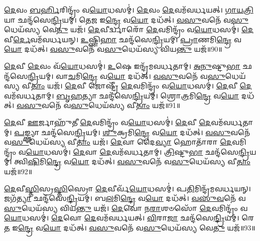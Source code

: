 \-\ul{𑌦𑍇}\-𑌵𑌂 \ul{𑌬}\-\-\ul{𑌰𑍍}\-𑌹𑌿𑌰𑌿𑌨𑍍𑌦𑍍𑌰𑌂᳴ 𑌵\-\ul{𑌯𑍋}\-𑌧𑌸𑌮𑍍॑।
\-\ul{𑌦𑍇}\-𑌵𑌂 \ul{𑌦𑍇}\-𑌵𑌮᳴𑌵𑌰𑍍𑌧𑌯𑌤𑍍।
\-\ul{𑌗𑌾}\-\-\ul{𑌯}\-\-\ul{𑌤𑍍𑌰𑌿}\-𑌯𑌾 𑌛𑌨𑍍𑌦᳴𑌸𑍇\-\ul{𑌨𑍍𑌦𑍍𑌰𑌿}\-𑌯𑌮𑍍।
𑌤𑍇\-\ul{𑌜} 𑌇\-\ul{𑌨𑍍𑌦𑍍𑌰𑍇} 𑌵\-\ul{𑌯𑍋} 𑌦𑌧᳴𑌤𑍍।
\-\ul{𑌵}\-\-\ul{𑌸𑍁}\-𑌵𑌨𑍇᳴ 𑌵\-\ul{𑌸𑍁}\-𑌧𑍇𑌯᳴𑌸𑍍𑌯 𑌵𑍇\-\ul{𑌤𑍁} 𑌯𑌜᳴।
\-\ul{𑌦𑍇}\-𑌵𑍀𑌰𑍍𑌦𑍍𑌵𑌾𑌰𑍋᳴ \ul{𑌦𑍇}\-𑌵𑌮𑌿𑌨𑍍𑌦𑍍𑌰𑌂᳴ 𑌵\-\ul{𑌯𑍋}\-𑌧𑌸𑌮𑍍॑।
\-\ul{𑌦𑍇}\-𑌵𑍀\-\ul{𑌰𑍍𑌦𑍇}\-𑌵𑌮᳴𑌵𑌰𑍍𑌧𑌯𑌨𑍍।
\-\ul{𑌉}\-𑌷𑍍𑌣𑌿\-\ul{𑌹𑌾} 𑌛𑌨𑍍𑌦᳴𑌸𑍇\-\ul{𑌨𑍍𑌦𑍍𑌰𑌿}\-𑌯𑌮𑍍।
\-\ul{𑌪𑍍𑌰𑌾}\-𑌣𑌮𑌿\-\ul{𑌨𑍍𑌦𑍍𑌰𑍇} 𑌵\-\ul{𑌯𑍋} 𑌦𑌧᳴𑌤𑍍।
\-\ul{𑌵}\-\-\ul{𑌸𑍁}\-𑌵𑌨𑍇᳴ 𑌵\-\ul{𑌸𑍁}\-𑌧𑍇𑌯᳴𑌸𑍍𑌯 𑌵𑌿𑌯\-\ul{𑌨𑍍𑌤𑍁} 𑌯𑌜᳴॥90॥

\-\ul{𑌦𑍇}\-𑌵𑍀 \ul{𑌦𑍇}\-𑌵𑌂 𑌵᳴\-\ul{𑌯𑍋}\-𑌧𑌸𑌮𑍍॑।
\-\ul{𑌉}\-𑌷𑍇 𑌇𑌨𑍍𑌦𑍍𑌰᳴𑌮𑌵𑌰𑍍𑌧𑌤𑌾𑌮𑍍।
\-\ul{𑌅}\-\-\ul{𑌨𑍁}\-𑌷𑍍𑌟𑍁\-\ul{𑌭𑌾} 𑌛𑌨𑍍𑌦᳴𑌸𑍇\-\ul{𑌨𑍍𑌦𑍍𑌰𑌿}\-𑌯𑌮𑍍।
𑌵𑌾\-\ul{𑌚}\-𑌮𑌿\-\ul{𑌨𑍍𑌦𑍍𑌰𑍇} 𑌵\-\ul{𑌯𑍋} 𑌦𑌧᳴𑌤𑍍।
\-\ul{𑌵}\-\-\ul{𑌸𑍁}\-𑌵𑌨𑍇᳴ 𑌵\-\ul{𑌸𑍁}\-𑌧𑍇𑌯᳴𑌸𑍍𑌯 𑌵𑍀\-\ul{𑌤𑌾𑌂} 𑌯𑌜᳴।
\-\ul{𑌦𑍇}\-𑌵𑍀 𑌜𑍋𑌷𑍍𑌟𑍍𑌰𑍀᳴ \ul{𑌦𑍇}\-𑌵𑌮𑌿𑌨𑍍𑌦𑍍𑌰𑌂᳴ 𑌵\-\ul{𑌯𑍋}\-𑌧𑌸𑌮𑍍॑।
\-\ul{𑌦𑍇}\-𑌵𑍀 \ul{𑌦𑍇}\-𑌵𑌮᳴𑌵𑌰𑍍𑌧𑌤𑌾𑌮𑍍।
\-\ul{𑌬𑍃}\-\-\ul{𑌹}\-𑌤𑍍𑌯𑌾 𑌛𑌨𑍍𑌦᳴𑌸𑍇\-\ul{𑌨𑍍𑌦𑍍𑌰𑌿}\-𑌯𑌮𑍍।
𑌶𑍍𑌰𑍋\-\ul{𑌤𑍍𑌰}\-𑌮𑌿\-\ul{𑌨𑍍𑌦𑍍𑌰𑍇} 𑌵\-\ul{𑌯𑍋} 𑌦𑌧᳴𑌤𑍍।
\-\ul{𑌵}\-\-\ul{𑌸𑍁}\-𑌵𑌨𑍇᳴ 𑌵\-\ul{𑌸𑍁}\-𑌧𑍇𑌯᳴𑌸𑍍𑌯 𑌵𑍀\-\ul{𑌤𑌾𑌂} 𑌯𑌜᳴॥91॥

\-\ul{𑌦𑍇}\-𑌵𑍀 \ul{𑌊}\-𑌰𑍍𑌜𑌾𑌹𑍁᳴𑌤𑍀 \ul{𑌦𑍇}\-𑌵𑌮𑌿𑌨𑍍𑌦𑍍𑌰𑌂᳴ 𑌵\-\ul{𑌯𑍋}\-𑌧𑌸𑌮𑍍॑।
\-\ul{𑌦𑍇}\-𑌵𑍀 \ul{𑌦𑍇}\-𑌵𑌮᳴𑌵𑌰𑍍𑌧𑌤𑌾𑌮𑍍।
\-\ul{𑌪}\-𑌙𑍍𑌕𑍍𑌤𑍍𑌯𑌾 𑌛𑌨𑍍𑌦᳴𑌸𑍇\-\ul{𑌨𑍍𑌦𑍍𑌰𑌿}\-𑌯𑌮𑍍।
\-\ul{𑌶𑍁}\-𑌕𑍍𑌰𑌮𑌿\-\ul{𑌨𑍍𑌦𑍍𑌰𑍇} 𑌵\-\ul{𑌯𑍋} 𑌦𑌧᳴𑌤𑍍।
\-\ul{𑌵}\-\-\ul{𑌸𑍁}\-𑌵𑌨𑍇᳴ 𑌵\-\ul{𑌸𑍁}\-𑌧𑍇𑌯᳴𑌸𑍍𑌯 𑌵𑍀\-\ul{𑌤𑌾𑌂} 𑌯𑌜᳴।
\-\ul{𑌦𑍇}\-𑌵𑌾 𑌦𑍈\-\ul{𑌵𑍍𑌯𑌾} 𑌹𑍋𑌤𑌾᳴𑌰𑌾 \ul{𑌦𑍇}\-𑌵𑌮𑌿𑌨𑍍𑌦𑍍𑌰𑌂᳴ 𑌵\-\ul{𑌯𑍋}\-𑌧𑌸𑌮𑍍॑।
\-\ul{𑌦𑍇}\-𑌵𑌾 \ul{𑌦𑍇}\-𑌵𑌮᳴𑌵𑌰𑍍𑌧𑌤𑌾𑌮𑍍।
\-\ul{𑌤𑍍𑌰𑌿}\-𑌷𑍍𑌟𑍁\-\ul{𑌭𑌾} 𑌛𑌨𑍍𑌦᳴𑌸𑍇\-\ul{𑌨𑍍𑌦𑍍𑌰𑌿}\-𑌯𑌮𑍍।
𑌤𑍍𑌵𑌿\-\ul{𑌷𑌿}\-𑌮𑌿\-\ul{𑌨𑍍𑌦𑍍𑌰𑍇} 𑌵\-\ul{𑌯𑍋} 𑌦𑌧᳴𑌤𑍍।
\-\ul{𑌵}\-\-\ul{𑌸𑍁}\-𑌵𑌨𑍇᳴ 𑌵\-\ul{𑌸𑍁}\-𑌧𑍇𑌯᳴𑌸𑍍𑌯 𑌵𑍀\-\ul{𑌤𑌾𑌂} 𑌯𑌜᳴॥92॥

\-\ul{𑌦𑍇}\-𑌵𑍀\-\ul{𑌸𑍍𑌤𑌿}\-𑌸𑍍𑌰\-\ul{𑌸𑍍𑌤𑌿}\-𑌸𑍍𑌰𑍋 \ul{𑌦𑍇}\-𑌵𑍀𑌰𑍍𑌵᳴\-\ul{𑌯𑍋}\-𑌧𑌸𑌮𑍍॑।
𑌪\-\ul{𑌤𑌿}\-𑌮𑌿𑌨𑍍𑌦𑍍𑌰᳴𑌮𑌵𑌰𑍍𑌧𑌯𑌨𑍍।
𑌜𑌗᳴\-\ul{𑌤𑍍𑌯𑌾} 𑌛𑌨𑍍𑌦᳴𑌸𑍇\-\ul{𑌨𑍍𑌦𑍍𑌰𑌿}\-𑌯𑌮𑍍।
𑌬\-\ul{𑌲}\-𑌮𑌿\-\ul{𑌨𑍍𑌦𑍍𑌰𑍇} 𑌵\-\ul{𑌯𑍋} 𑌦𑌧᳴𑌤𑍍।
\-\ul{𑌵}\-\-\ul{𑌸𑍁}\-\-\ul{𑌵}\-𑌨𑍇᳴ 𑌵\-\ul{𑌸𑍁}\-𑌧𑍇𑌯᳴𑌸𑍍𑌯 𑌵𑌿𑌯\-\ul{𑌨𑍍𑌤𑍁} 𑌯𑌜᳴।
\-\ul{𑌦𑍇}\-𑌵𑍋 𑌨\-\ul{𑌰𑌾}\-𑌶𑍞𑌸𑍋᳴ \ul{𑌦𑍇}\-𑌵𑌮𑌿𑌨𑍍𑌦𑍍𑌰𑌂᳴ 𑌵\-\ul{𑌯𑍋}\-𑌧𑌸𑌮𑍍॑।
\-\ul{𑌦𑍇}\-𑌵𑍋 \ul{𑌦𑍇}\-𑌵𑌮᳴𑌵𑌰𑍍𑌧𑌯𑌤𑍍।
\-\ul{𑌵𑌿}\-𑌰𑌾\-\ul{𑌜𑌾} 𑌛𑌨𑍍𑌦᳴𑌸𑍇\-\ul{𑌨𑍍𑌦𑍍𑌰𑌿}\-𑌯𑌮𑍍।
𑌰𑍇\-\ul{𑌤} 𑌇\-\ul{𑌨𑍍𑌦𑍍𑌰𑍇} 𑌵\-\ul{𑌯𑍋} 𑌦𑌧᳴𑌤𑍍।
\-\ul{𑌵}\-\-\ul{𑌸𑍁}\-𑌵𑌨𑍇᳴ 𑌵\-\ul{𑌸𑍁}\-𑌧𑍇𑌯᳴𑌸𑍍𑌯 𑌵𑍇\-\ul{𑌤𑍁} 𑌯𑌜᳴॥93॥

